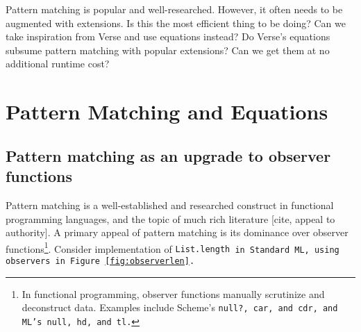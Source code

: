 \documentclass[manuscript,screen,review, 12pt]{acmart}
\begin{document}
Pattern matching is popular and well-researched. However, it often needs to be
augmented with extensions. Is this the most efficient thing to be doing? Can we
take inspiration from Verse and use equations instead? Do Verse's equations
subsume pattern matching with popular extensions? Can we get them at no
additional runtime cost? 


\section{Pattern Matching and Equations}
\subsection{Pattern matching as an upgrade to observer functions}
    
    
    Pattern matching is a well-established and researched construct in
    functional programming languages, and the topic of much rich literature
    [cite, appeal to authority]. A primary appeal of pattern matching is its
    dominance over observer functions\footnote{In functional programming,
    observer functions manually scrutinize and deconstruct data. Examples
    include Scheme's \tt{null?}, \tt{car}, and \tt{cdr}, and ML's \tt{null},
    \tt{hd}, and \tt{tl}.}. Consider implementation of \tt{List.length} in Standard
    ML, using observers in Figure~\ref{fig:observerlen}. 
    
    
    
    
    
    
\end{document}
